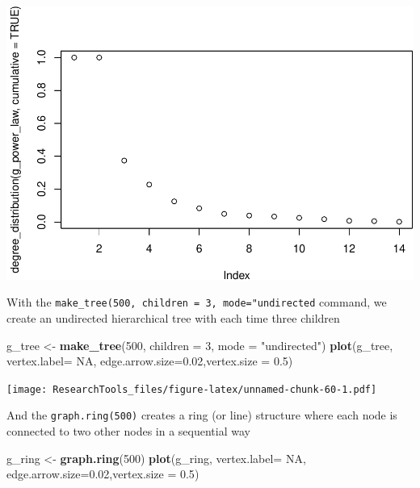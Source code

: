 \documentclass[]{article}
\newenvironment{Shaded}{\begin{snugshade}}{\end{snugshade}}
\newcommand{\KeywordTok}[1]{\textcolor[rgb]{0.13,0.29,0.53}{\textbf{#1}}}
\newcommand{\DataTypeTok}[1]{\textcolor[rgb]{0.13,0.29,0.53}{#1}}
\newcommand{\DecValTok}[1]{\textcolor[rgb]{0.00,0.00,0.81}{#1}}
\newcommand{\FloatTok}[1]{\textcolor[rgb]{0.00,0.00,0.81}{#1}}
\newcommand{\StringTok}[1]{\textcolor[rgb]{0.31,0.60,0.02}{#1}}
\newcommand{\OtherTok}[1]{\textcolor[rgb]{0.56,0.35,0.01}{#1}}
\newcommand{\NormalTok}[1]{#1}
\theoremstyle{definition}
\theoremstyle{definition}
\theoremstyle{definition}
\theoremstyle{remark}
\begin{document}
\includegraphics{ResearchTools_files/figure-latex/unnamed-chunk-59-1.pdf}

With the \texttt{make\_tree(500,\ children\ =\ 3,\ mode="undirected}
command, we create an undirected hierarchical tree with each time three
children

\begin{Shaded}
\begin{Highlighting}[]
\NormalTok{g_tree <-}\StringTok{ }\KeywordTok{make_tree}\NormalTok{(}\DecValTok{500}\NormalTok{, }\DataTypeTok{children =} \DecValTok{3}\NormalTok{, }\DataTypeTok{mode =} \StringTok{"undirected"}\NormalTok{)}
\KeywordTok{plot}\NormalTok{(g_tree, }\DataTypeTok{vertex.label=} \OtherTok{NA}\NormalTok{, }\DataTypeTok{edge.arrow.size=}\FloatTok{0.02}\NormalTok{,}\DataTypeTok{vertex.size =} \FloatTok{0.5}\NormalTok{)}
\end{Highlighting}
\end{Shaded}

\texttt{[image: ResearchTools\_files/figure-latex/unnamed-chunk-60-1.pdf]}

And the \texttt{graph.ring(500)} creates a ring (or line) structure
where each node is connected to two other nodes in a sequential way

\begin{Shaded}
\begin{Highlighting}[]
\NormalTok{g_ring <-}\StringTok{ }\KeywordTok{graph.ring}\NormalTok{(}\DecValTok{500}\NormalTok{)}
\KeywordTok{plot}\NormalTok{(g_ring, }\DataTypeTok{vertex.label=} \OtherTok{NA}\NormalTok{, }\DataTypeTok{edge.arrow.size=}\FloatTok{0.02}\NormalTok{,}\DataTypeTok{vertex.size =} \FloatTok{0.5}\NormalTok{)}
\end{Highlighting}
\end{Shaded}
\end{document}
